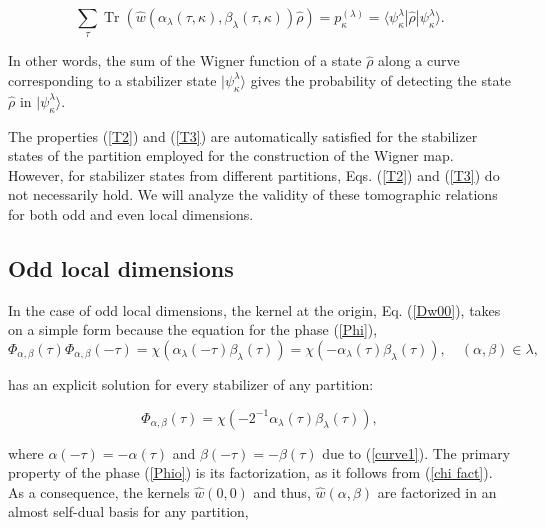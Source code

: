 \documentclass[quantumrep,article,submit,pdftex,moreauthors]{Definitions/mdpi}
\DeclareMathOperator{\Tr}{Tr}
\begin{document}
\begin{equation}
  \sum_{\tau } \Tr\left(
    \hat{w}\left(
      \alpha_{\lambda}(\tau,\kappa),\beta_{\lambda}(\tau,\kappa)
    \right)
    \hat{\rho}
  \right)
  = p_{\kappa}^{(\lambda)} = \langle \psi_{\kappa}^{\lambda}
  |\hat{\rho}|\psi_{\kappa}^{\lambda}\rangle.
  \label{T3}
\end{equation}

In other words, the sum of the Wigner function of a state $\hat{\rho}$ along a
curve corresponding to a stabilizer state $|\psi _{\kappa }^{\lambda }\rangle$
gives the probability of detecting the state $\hat{\rho}$ in $|\psi_{\kappa
}^{\lambda}\rangle$.

The properties (\ref{T2}) and (\ref{T3}) are automatically satisfied for the
stabilizer states of the partition employed for the construction of the Wigner
map. However, for stabilizer states from different partitions, Eqs.
(\ref{T2}) and (\ref{T3}) do not necessarily hold. We will analyze the validity
of these tomographic relations for both odd and even local dimensions.

\subsection{Odd local dimensions}

In the case of odd local dimensions, the kernel at the origin, Eq.
(\ref{Dw00}), takes on a simple form because the equation for the phase
(\ref{Phi}),
\begin{equation*}
  \Phi_{\alpha,\beta} (\tau) \Phi_{\alpha,\beta}(-\tau)
  = \chi\left(\alpha_{\lambda}(-\tau)\beta_{\lambda}(\tau)\right)
  = \chi\left(-\alpha_{\lambda}(\tau)\beta_{\lambda}(\tau)\right),
  \quad (\alpha,\beta) \in \lambda,
\end{equation*}

has an explicit solution for every stabilizer of any partition:

\begin{equation}
  \Phi_{\alpha,\beta}(\tau)
  = \chi\left(
    -2^{-1}\alpha_{\lambda }(\tau) \beta_{\lambda }(\tau)
  \right),
  \label{Phio}
\end{equation}

where $\alpha(-\tau) = -\alpha(\tau)$ and $\beta(-\tau) = -\beta(\tau)$
due to (\ref{curve1}). The primary property of the phase (\ref{Phio}) is its
factorization, as it follows from (\ref{chi fact}). As a consequence, the
kernels $\hat{w}\left(0,0\right)$ and thus, $\hat{w}\left(\alpha,\beta\right)$
are factorized in an almost self-dual basis for any partition,
\end{document}
